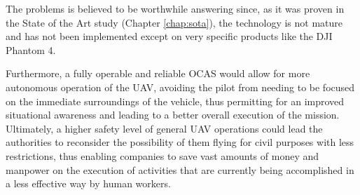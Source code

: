 The problems is believed to be worthwhile answering since, as it was proven in the State of the Art study (Chapter \ref{chap:sota}), the technology is not mature and has not been implemented except on very specific products like the DJI Phantom 4.

Furthermore, a fully operable and reliable OCAS would allow for more autonomous operation of the UAV, avoiding the pilot from needing to be focused on the immediate surroundings of the vehicle, thus permitting for an improved situational awareness and leading to a better overall execution of the mission.
Ultimately, a higher safety level of general UAV operations could lead the authorities to reconsider the possibility of them flying for civil purposes with less restrictions, thus enabling companies to save vast amounts of money and manpower on the execution of activities that are currently being accomplished in a less effective way by human workers.


